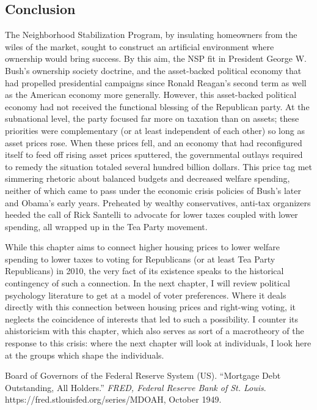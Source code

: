 \documentclass[
]{article}
\begin{document}
\hypertarget{conclusion}{%
\subsection{Conclusion}\label{conclusion}}

The Neighborhood Stabilization Program, by insulating homeowners from the wiles of the market, sought to construct an artificial environment where ownership would bring success.
By this aim, the NSP fit in President George W. Bush's ownership society doctrine, and the asset-backed political economy that had propelled presidential campaigns since Ronald Reagan's second term as well as the American economy more generally.
However, this asset-backed political economy had not received the functional blessing of the Republican party. At the subnational level, the party focused far more on taxation than on assets; these priorities were complementary (or at least independent of each other) so long as asset prices rose.
When these prices fell, and an economy that had reconfigured itself to feed off rising asset prices sputtered, the governmental outlays required to remedy the situation totaled several hundred billion dollars.
This price tag met simmering rhetoric about balanced budgets and decreased welfare spending, neither of which came to pass under the economic crisis policies of Bush's later and Obama's early years.
Preheated by wealthy conservatives, anti-tax organizers heeded the call of Rick Santelli to advocate for lower taxes coupled with lower spending, all wrapped up in the Tea Party movement.

While this chapter aims to connect higher housing prices to lower welfare spending to lower taxes to voting for Republicans (or at least Tea Party Republicans) in 2010, the very fact of its existence speaks to the historical contingency of such a connection.
In the next chapter, I will review political psychology literature to get at a model of voter preferences.
Where it deals directly with this connection between housing prices and right-wing voting, it neglects the coincidence of interests that led to such a possibility.
I counter its ahistoricism with this chapter, which also serves as sort of a macrotheory of the response to this crisis: where the next chapter will look at individuals, I look here at the groups which shape the individuals.

\hypertarget{refs}{}
\leavevmode\hypertarget{ref-boardofgovernorsofthefederalreservesystemus1949mortgagec}{}%
Board of Governors of the Federal Reserve System (US). ``Mortgage Debt Outstanding, All Holders.'' \emph{FRED, Federal Reserve Bank of St. Louis}. https://fred.stlouisfed.org/series/MDOAH, October 1949.
\end{document}
